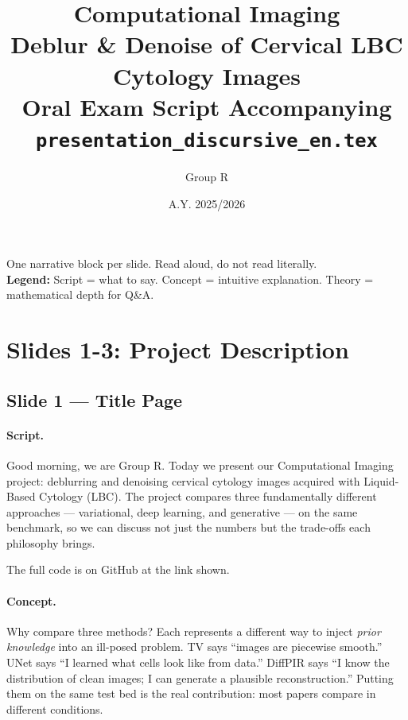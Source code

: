 \documentclass[english,11pt,a4paper]{article}
\title{\vspace{-1cm}\textcolor{accent}{\textbf{Computational Imaging}} \\[0.1cm]
       Deblur \& Denoise of Cervical LBC Cytology Images \\[0.2cm]
       \large\textcolor{muted}{Oral Exam Script \hfill Accompanying \texttt{presentation\_discursive\_en.tex}}}
\author{Group R}
\date{A.Y. 2025/2026}
\begin{document}
\maketitle
\thispagestyle{empty}
\vspace{0.3cm}
\begin{center}
\small\textcolor{muted}{One narrative block per slide. Read aloud, do not read literally.\\[0.15cm]
\textbf{Legend:} \textcolor{accent}{Script} = what to say. \textcolor{fg}{Concept} = intuitive explanation. \textcolor{theory}{Theory} = mathematical depth for Q\&A.}
\end{center}
\newpage
\tableofcontents
\newpage

\section{Slides 1-3: Project Description}

\subsection{Slide 1 --- Title Page}

\paragraph{Script.}
Good morning, we are Group R. Today we present our Computational Imaging
project: deblurring and denoising cervical cytology images acquired with
Liquid-Based Cytology (LBC). The project compares three fundamentally
different approaches --- variational, deep learning, and generative ---
on the same benchmark, so we can discuss not just the numbers but the
trade-offs each philosophy brings.

The full code is on GitHub at the link shown.

\paragraph{Concept.}
Why compare three methods? Each represents a different way to inject
\textit{prior knowledge} into an ill-posed problem. TV says ``images are
piecewise smooth.'' UNet says ``I learned what cells look like from data.''
DiffPIR says ``I know the distribution of clean images; I can generate
a plausible reconstruction.'' Putting them on the same test bed is the
real contribution: most papers compare in different conditions.
\end{document}
